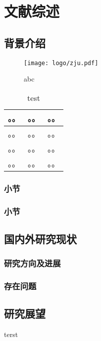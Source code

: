\chapter{文献综述}

\section{背景介绍}

\begin{figure}[htbp]
\texttt{[image: logo/zju.pdf]}
\caption{abc}
\end{figure}


\begin{table}[htbp]
 \caption{\label{tab:test}test}
 \begin{tabular}{lcl}
  \toprule
  。。 & 。。 & 。。 \\
  \midrule
 。。 & 。。 & 。。 \\
 。。 & 。。 & 。。 \\
 。。 & 。。 & 。。 \\
  \bottomrule
 \end{tabular}
\end{table}


\subsection{小节}

\subsection{小节}

\clearpage

\section{国内外研究现状}

    \subsection{研究方向及进展}

    \subsection{存在问题}

\section{研究展望}
terst

\cite{testbib2}

\cite{testbib}

\printbibliography[heading=subbibliography]

